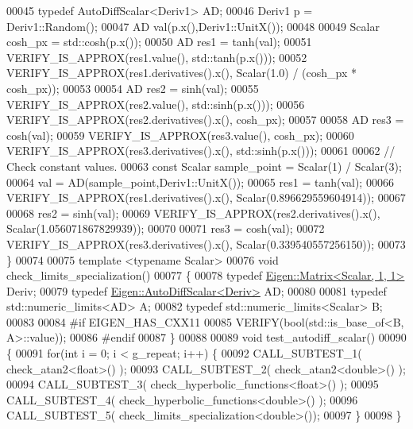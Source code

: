 \begin{DoxyCode}
00045   \textcolor{keyword}{typedef} AutoDiffScalar<Deriv1> AD;
00046   Deriv1 p = Deriv1::Random();
00047   AD val(p.x(),Deriv1::UnitX());
00048 
00049   Scalar cosh\_px = std::cosh(p.x());
00050   AD res1 = tanh(val);
00051   VERIFY\_IS\_APPROX(res1.value(), std::tanh(p.x()));
00052   VERIFY\_IS\_APPROX(res1.derivatives().x(), Scalar(1.0) / (cosh\_px * cosh\_px));
00053 
00054   AD res2 = sinh(val);
00055   VERIFY\_IS\_APPROX(res2.value(), std::sinh(p.x()));
00056   VERIFY\_IS\_APPROX(res2.derivatives().x(), cosh\_px);
00057 
00058   AD res3 = cosh(val);
00059   VERIFY\_IS\_APPROX(res3.value(), cosh\_px);
00060   VERIFY\_IS\_APPROX(res3.derivatives().x(), std::sinh(p.x()));
00061 
00062   \textcolor{comment}{// Check constant values.}
00063   \textcolor{keyword}{const} Scalar sample\_point = Scalar(1) / Scalar(3); 
00064   val = AD(sample\_point,Deriv1::UnitX());
00065   res1 = tanh(val);
00066   VERIFY\_IS\_APPROX(res1.derivatives().x(), Scalar(0.896629559604914));
00067 
00068   res2 = sinh(val);
00069   VERIFY\_IS\_APPROX(res2.derivatives().x(), Scalar(1.056071867829939));
00070 
00071   res3 = cosh(val);
00072   VERIFY\_IS\_APPROX(res3.derivatives().x(), Scalar(0.339540557256150));
00073 \}
00074 
00075 \textcolor{keyword}{template} <\textcolor{keyword}{typename} Scalar>
00076 \textcolor{keywordtype}{void} check\_limits\_specialization()
00077 \{
00078   \textcolor{keyword}{typedef} \hyperlink{group___core___module_class_eigen_1_1_matrix}{Eigen::Matrix<Scalar, 1, 1>} Deriv;
00079   \textcolor{keyword}{typedef} \hyperlink{class_eigen_1_1_auto_diff_scalar}{Eigen::AutoDiffScalar<Deriv>} AD;
00080 
00081   \textcolor{keyword}{typedef} std::numeric\_limits<AD> A;
00082   \textcolor{keyword}{typedef} std::numeric\_limits<Scalar> B;
00083 
00084 \textcolor{preprocessor}{#if EIGEN\_HAS\_CXX11}
00085   VERIFY(\textcolor{keywordtype}{bool}(std::is\_base\_of<B, A>::value));
00086 \textcolor{preprocessor}{#endif}
00087 \}
00088 
00089 \textcolor{keywordtype}{void} test\_autodiff\_scalar()
00090 \{
00091   \textcolor{keywordflow}{for}(\textcolor{keywordtype}{int} i = 0; i < g\_repeat; i++) \{
00092     CALL\_SUBTEST\_1( check\_atan2<float>() );
00093     CALL\_SUBTEST\_2( check\_atan2<double>() );
00094     CALL\_SUBTEST\_3( check\_hyperbolic\_functions<float>() );
00095     CALL\_SUBTEST\_4( check\_hyperbolic\_functions<double>() );
00096     CALL\_SUBTEST\_5( check\_limits\_specialization<double>());
00097   \}
00098 \}
\end{DoxyCode}
